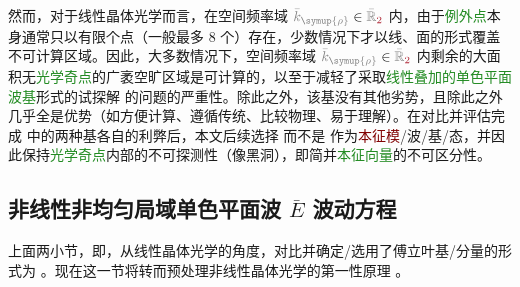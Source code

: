 然而，对于线性晶体光学而言，在空间频率域 $\mathcolor{gray}{\bar{k}_{\symup{\rho}}} \in \mathcolor{gray}{\bar{\mathbb{R}}_{\textcolor{Maroon}{2}}}$ 内，由于\textcolor{ForestGreen}{例外点}本身通常只以有限个点（一般最多 8 个\cite{berryOpticalSingularitiesBirefringent2003,berryOpticalSingularitiesBianisotropic2005,sturmPropagationElectromagneticWaves,sturmSingularOpticalAxes2016a,grundmannOpticallyAnisotropicMedia2017}）存在，少数情况下才以线、面的形式覆盖不可计算区域\cite{xieAnalytic3DVector}。因此，大多数情况下，空间频率域 $\mathcolor{gray}{\bar{k}_{\symup{\rho}}} \in \mathcolor{gray}{\bar{\mathbb{R}}_{\textcolor{Maroon}{2}}}$ 内剩余的大面积无\textcolor{ForestGreen}{光学奇点}的广袤空旷区域是可计算的，以至于减轻了采取\textcolor{ForestGreen}{线性叠加的单色平面波基}形式的试探解  的问题的严重性。除此之外，该基没有其他劣势，且除此之外几乎全是优势（如方便计算、遵循传统、比较物理、易于理解）。在对比并评估完成  中的两种基各自的利弊后，本文后续选择  而不是  作为\textcolor{Maroon}{本征模}/波/基/态，并因此保持\textcolor{ForestGreen}{光学奇点}内部的不可探测性（像黑洞），即简并\textcolor{ForestGreen}{本征向量}的不可区分性。

%

\subsection{非线性非均匀局域单色平面波 $\bar{E}$ 波动方程}\label{ssec:E-waveq-nonlinear}

上面两小节，即，从线性晶体光学的角度，对比并确定/选用了傅立叶基/分量的形式为 。现在这一节将转而预处理非线性晶体光学的第一性原理 。


